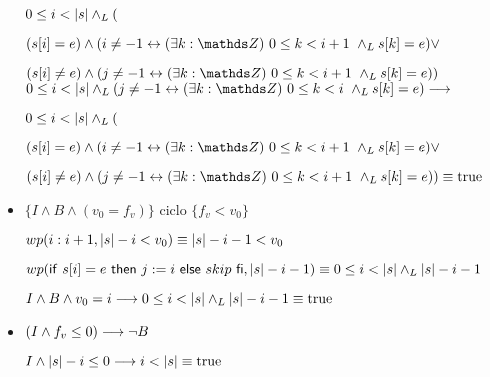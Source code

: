 \documentclass{article}
\begin{document}
\begin{itemize}
    $0 \leq i < |s| \land _L ( $

    $(s[i] = e) \wedge (i \neq -1 \Iff \existe{k}{0}{i+1} \yLuego s[k] = e) \vee$

    $(s[i] \neq e) \wedge (j \neq -1 \Iff \existe{k}{0}{i+1} \yLuego s[k] = e))$ \\

    $0 \leq i < \longitud{s} \yLuego (j \neq -1 \Iff \existe{k}{0}{i} \yLuego s[k] = e) \implica$

    $0 \leq i < |s| \land _L ( $

    $(s[i] = e) \wedge (i \neq -1 \Iff \existe{k}{0}{i+1} \yLuego s[k] = e) \vee$

    $(s[i] \neq e) \wedge (j \neq -1 \Iff \existe{k}{0}{i+1} \yLuego s[k] = e)) \equiv \True $ \\

    \item $\{I \wedge B \wedge (v_{0} = f_{v})\}$ ciclo $\{f_{v} < v_{0}\}$
    
    $wp(i:i+1, |s|-i<v_{0}) \equiv |s|-i-1<v_{0}$

    $wp(\mathsf{if}\ s[i]=e\ \mathsf{then}\ j:=i\ \mathsf{else}\ skip\ \mathsf{fi}, |s|-i-1) \equiv 0 \leq i < |s| \land _L |s|-i-1$

    $I \wedge B \wedge v_{0} = i \longrightarrow 0 \leq i < |s| \land _L |s|-i-1 \equiv \mathrm{true}$

    \item $(I \wedge f_{v} \leq 0) \longrightarrow \neg B$

    $I \wedge |s|-i \leq 0 \longrightarrow i < |s| \equiv \mathrm{true}$
\end{itemize}
\end{document}
